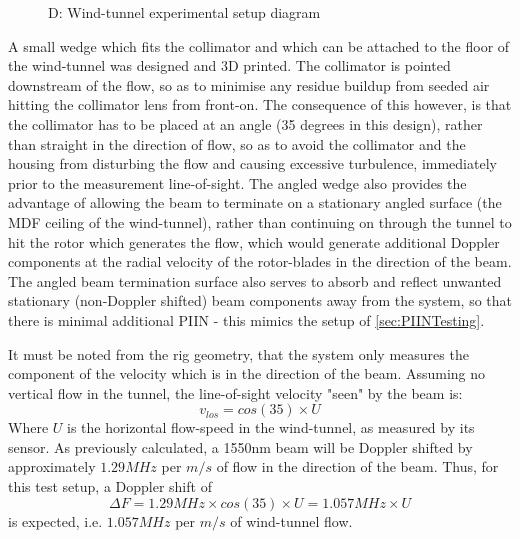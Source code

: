 \begin{figure}[H]
{
	}
	\caption{D: Wind-tunnel experimental setup diagram}
	\label{fig:DRig}
\end{figure}



A small wedge which fits the collimator and which can be attached to the floor of the wind-tunnel was designed and 3D printed. The collimator is pointed downstream of the flow, so as to minimise any residue buildup from seeded air hitting the collimator lens from front-on. The consequence of this however, is that the collimator has to be placed at an angle (35 degrees in this design), rather than straight in the direction of flow, so as to avoid the collimator and the housing from disturbing the flow and causing excessive turbulence, immediately prior to the measurement line-of-sight. The angled wedge also provides the advantage of allowing the beam to terminate on a stationary angled surface (the MDF ceiling of the wind-tunnel), rather than continuing on through the tunnel to hit the rotor which generates the flow, which would generate additional Doppler components at the radial velocity of the rotor-blades in the direction of the beam. The angled beam termination surface also serves to absorb and reflect unwanted stationary (non-Doppler shifted) beam components away from the system, so that there is minimal additional PIIN - this mimics the setup of \autoref{sec:PIINTesting}.

 It must be noted from the rig geometry, that the system only measures the component of the velocity which is in the direction of the beam. Assuming no vertical flow in the tunnel, the line-of-sight velocity "seen" by the beam is:
 \begin{equation}
 	 v_{los}=cos(35)\times U
 \end{equation}
 Where $U$ is the horizontal flow-speed in the wind-tunnel, as measured by its sensor. As previously calculated, a 1550nm beam will be Doppler shifted by approximately $1.29MHz$ per $m/s$ of flow in the direction of the beam. Thus, for this test setup, a Doppler shift of
 \begin{equation}
 	\Delta F = 1.29MHz \times cos(35) \times U = 1.057MHz \times U
 \end{equation} 
 is expected, i.e. $1.057MHz$ per $m/s$ of wind-tunnel flow. 
 

